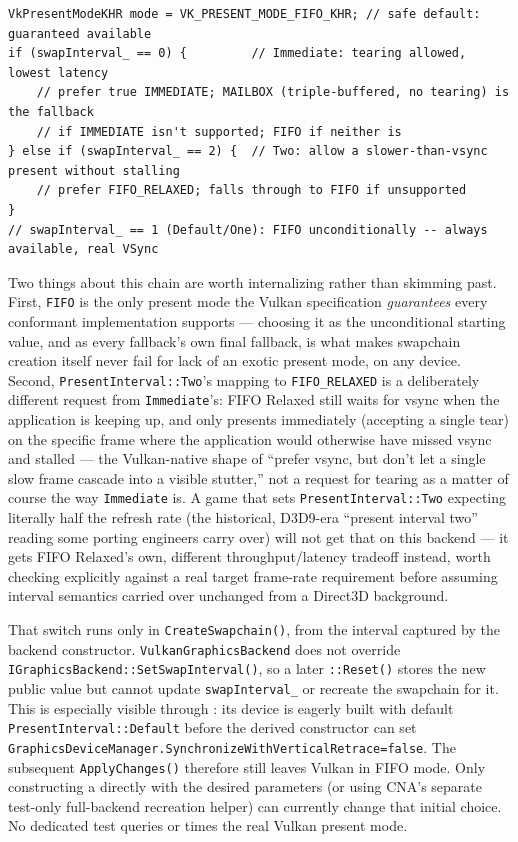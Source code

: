 \begin{lstlisting}
VkPresentModeKHR mode = VK_PRESENT_MODE_FIFO_KHR; // safe default: guaranteed available
if (swapInterval_ == 0) {         // Immediate: tearing allowed, lowest latency
    // prefer true IMMEDIATE; MAILBOX (triple-buffered, no tearing) is the fallback
    // if IMMEDIATE isn't supported; FIFO if neither is
} else if (swapInterval_ == 2) {  // Two: allow a slower-than-vsync present without stalling
    // prefer FIFO_RELAXED; falls through to FIFO if unsupported
}
// swapInterval_ == 1 (Default/One): FIFO unconditionally -- always available, real VSync
\end{lstlisting}

Two things about this chain are worth internalizing rather than skimming past. First,
\texttt{FIFO} is the only present mode the Vulkan specification \emph{guarantees} every
conformant implementation supports --- choosing it as the unconditional starting value, and as
every fallback's own final fallback, is what makes swapchain creation itself never fail for
lack of an exotic present mode, on any device. Second, \texttt{PresentInterval::Two}'s mapping
to \texttt{FIFO\_RELAXED} is a deliberately different request from \texttt{Immediate}'s: FIFO
Relaxed still waits for vsync when the application is keeping up, and only presents
immediately (accepting a single tear) on the specific frame where the application would
otherwise have missed vsync and stalled --- the Vulkan-native shape of ``prefer vsync, but
don't let a single slow frame cascade into a visible stutter,'' not a request for tearing as a
matter of course the way \texttt{Immediate} is. A game that sets \texttt{PresentInterval::Two}
expecting literally half the refresh rate (the historical, D3D9-era ``present interval two''
reading some porting engineers carry over) will not get that on this backend --- it gets FIFO
Relaxed's own, different throughput/latency tradeoff instead, worth checking explicitly against
a real target frame-rate requirement before assuming interval semantics carried over unchanged
from a Direct3D background.

\begin{sourcenote}
That switch runs only in \texttt{CreateSwapchain()}, from the interval captured by the
backend constructor. \texttt{VulkanGraphics\allowbreak Backend} does not override
\texttt{IGraphicsBackend::SetSwap\allowbreak Interval()}, so a later
\texttt{::Reset()} stores the new public value but cannot update
\texttt{swapInterval\_} or recreate the swapchain for it. This is especially visible through
: its device is eagerly built with default \texttt{PresentInterval::Default}
before the derived constructor can set
\texttt{GraphicsDevice\allowbreak Manager.SynchronizeWith\allowbreak VerticalRetrace=false}.
The subsequent
\texttt{ApplyChanges()} therefore still leaves Vulkan in FIFO mode. Only constructing a
 directly with the desired parameters (or using CNA's separate
test-only full-backend recreation helper) can currently change that initial choice. No
dedicated test queries or times the real Vulkan present mode.
\end{sourcenote}

